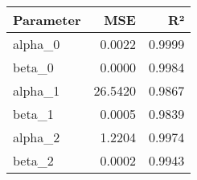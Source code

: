 \begin{tabular}{lrr}
\toprule
Parameter & MSE & R² \\
\midrule
alpha_0 & 0.0022 & 0.9999 \\
beta_0 & 0.0000 & 0.9984 \\
alpha_1 & 26.5420 & 0.9867 \\
beta_1 & 0.0005 & 0.9839 \\
alpha_2 & 1.2204 & 0.9974 \\
beta_2 & 0.0002 & 0.9943 \\
\bottomrule
\end{tabular}
